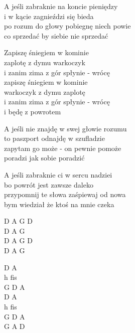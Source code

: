 \begin{text}
    A jeśli zabraknie na koncie pieniędzy\\
    i w kącie zagnieździ się bieda\\
    po rozum do głowy pobiegnę niech powie\\
    co sprzedać by siebie nie sprzedać

    Zapiszę śniegiem w kominie\\
    zaplotę z dymu warkoczyk\\
    i zanim zima z gór spłynie - wrócę\\
    zapiszę śniegiem w kominie\\
    warkoczyk z dymu zaplotę\\
    i zanim zima z gór spłynie - wrócę\\
    i będę z powrotem

    A jeśli nie znajdę w swej głowie rozumu\\
    to paszport odnajdę w szufladzie\\
    zapytam go może - on pewnie pomoże\\
    poradzi jak sobie poradzić

    A jeśli zabraknie ci w sercu nadziei\\
    bo powrót jest zawsze daleko\\
    przypomnij te słowa zaśpiewaj od nowa\\
    bym wiedział że ktoś na mnie czeka
\end{text}
\begin{chord}
    D A G D\\
    D A G\\
    D A G D\\
    D A G

    D A\\
    h fis\\
    G D A\\
    D A\\
    h fis\\
    G D A\\
    G A D
\end{chord}